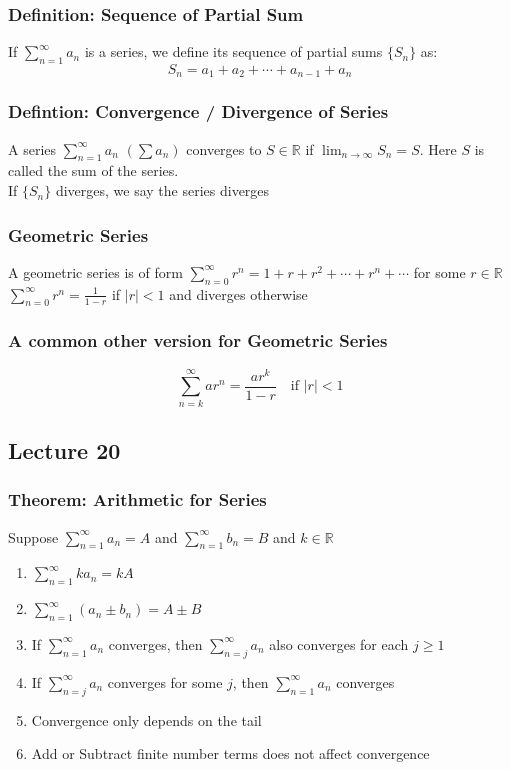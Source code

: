 \documentclass[12pt, letterpaper]{article}
\begin{document}
\subsubsection{Definition: Sequence of Partial Sum}
If $\displaystyle\sum_{n=1}^{\infty}a_n$ is a series, we define its sequence of partial sums $\{S_n\}$ as:
\[S_n = a_1 + a_2 + \cdots + a_{n-1} + a_n\]
\subsubsection{Defintion: Convergence / Divergence of Series}
A series $\displaystyle\sum_{n=1}^{\infty}a_n$ $(\sum a_n)$ converges to $S\in\mathbb{R}$ if $\displaystyle\lim_{n\to\infty}S_n = S$.
Here $S$ is called the sum of the series. \\
If $\{S_n\}$ diverges, we say the series diverges
\subsubsection{Geometric Series}
A geometric series is of form $\displaystyle\sum_{n=0}^{\infty}r^n = 1 + r + r^2 + \cdots + r^n + \cdots$ for some $r\in\mathbb{R}$ \\
$\displaystyle\sum_{n=0}^{\infty}r^n = \frac{1}{1-r}$ if $|r|<1$ and diverges otherwise 
\subsubsection*{A common other version for Geometric Series}
\[\sum_{n=k}^{\infty}ar^n = \frac{ar^k}{1-r} \quad \text{if $|r|<1$}\]
\subsection{Lecture 20}
\subsubsection{Theorem: Arithmetic for Series}
Suppose $\displaystyle\sum_{n=1}^{\infty}a_n = A$ and $\displaystyle\sum_{n=1}^{\infty}b_n = B$ and $k\in\mathbb{R}$
\begin{enumerate}
    \item $\displaystyle\sum_{n=1}^{\infty}ka_n = kA$
    \item $\displaystyle\sum_{n=1}^{\infty}(a_n \pm b_n) = A \pm B$
    \item If $\displaystyle\sum_{n=1}^{\infty}a_n$ converges, then $\displaystyle\sum_{n=j}^{\infty}a_n$ also converges for each $j\geq1$
    \item If $\displaystyle\sum_{n=j}^{\infty}a_n$ converges for some $j$, then $\displaystyle\sum_{n=1}^{\infty}a_n$ converges 
    \item[] Convergence only depends on the tail 
    \item[] Add or Subtract finite number terms does not affect convergence
\end{enumerate}
\end{document}
